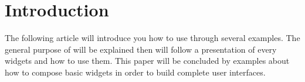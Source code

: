 \section{Introduction}


The following article will introduce you how to use \spec through several examples. 
The general purpose of \spec will be explained then will follow a presentation of every \spec widgets and how to use them.
This paper will be concluded by  examples about how to compose basic widgets in order to build complete user interfaces.